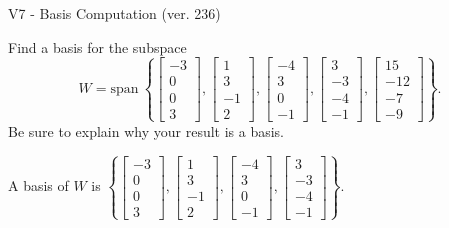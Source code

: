 \begin{exercise}
  \begin{exerciseTitle}V7 - Basis Computation (ver. 236)\end{exerciseTitle}
  \begin{exerciseStatement}
    Find a basis for the subspace 
\[W=\mathrm{span}\ \left\{\left[\begin{array}{r}
-3 \\
0 \\
0 \\
3
\end{array}\right] , \left[\begin{array}{r}
1 \\
3 \\
-1 \\
2
\end{array}\right] , \left[\begin{array}{r}
-4 \\
3 \\
0 \\
-1
\end{array}\right] , \left[\begin{array}{r}
3 \\
-3 \\
-4 \\
-1
\end{array}\right] , \left[\begin{array}{r}
15 \\
-12 \\
-7 \\
-9
\end{array}\right]\right\}.\]
 Be sure to explain why your result is a basis.


  \end{exerciseStatement}
  \begin{exerciseAnswer}
   A basis of \(W\) is  \(\left\{\left[\begin{array}{r}
-3 \\
0 \\
0 \\
3
\end{array}\right] , \left[\begin{array}{r}
1 \\
3 \\
-1 \\
2
\end{array}\right] , \left[\begin{array}{r}
-4 \\
3 \\
0 \\
-1
\end{array}\right] , \left[\begin{array}{r}
3 \\
-3 \\
-4 \\
-1
\end{array}\right]\right\}\).
  


  \end{exerciseAnswer}
\end{exercise}